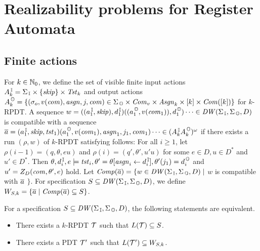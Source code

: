 \section{Realizability problems for Register Automata}
\subsection{Finite actions}
For $k\in\mathbb{N}_0$,
we define the set of visible finite input actions $A_k^{\, \mathbb{I}} = \Sigma_{\, \mathbb{I}}\times\{\mathit{skip}\}\times \mathit{Tst}_k$
and output actions $A_k^{\, \mathbb{O}} = \{(\sigma_o, v(\mathit{com}), \mathit{asgn}, j, \mathit{com})\in \Sigma_{\, \mathbb{O}}\times\mathit{Com}_v\times \mathit{Asgn}_k\times [k]\times \mathit{Com}([k])\}$ for $k$-RPDT.
A sequence $w = ((a^{\, \mathbb{I}}_1, \mathit{skip}),d^{\, \mathbb{I}}_1) ((a^{\, \mathbb{O}}_1,v(\mathit{com}_1)),d^{\, \mathbb{O}}_1)\cdots \in \mathit{DW}(\Sigma_{\, \mathbb{I}},\Sigma_{\, \mathbb{O}},D)$ is compatible with a sequence
$\overline{a} = (a^{\, \mathbb{I}}_1, \mathit{skip},\mathit{tst}_1)(a^{\, \mathbb{O}}_1,v(\mathit{com}_1),\mathit{asgn}_1,j_1, \mathit{com}_1)\cdots \in (A_k^{\, \mathbb{I}} A_k^{\, \mathbb{O}})^\omega$
if there exists a run $(\rho, w)$ of $k$-RPDT satisfying follows:
For all $i\geq 1$, let $\rho(i-1)=(q,\theta,eu)$ and $\rho(i)=(q',\theta',u'u)$
for some $e\in D, u\in D^*$ and $u'\in D^*$.
Then $\theta, d^{\, \mathbb{I}}_i, e\models \mathit{tst}_i, \theta'=\theta[\mathit{asgn}_i\leftarrow d^{\, \mathbb{I}}_i], \theta'(j_1) = d^{\, \mathbb{O}}_i$ and $u'=Z_D(\mathit{com},\theta',e)$ hold.
Let ${\mathit{Comp}}(\overline{a}) = \{w\in \mathit{DW}(\Sigma_{\, \mathbb{I}},\Sigma_{\, \mathbb{O}},D)\mid$ $w$ is compatible with $\overline{a}$ $\}$.
For specification $S \subseteq \mathit{DW}(\Sigma_{\, \mathbb{I}},\Sigma_{\, \mathbb{O}},D)$, we define $W_{S,k}=\{\overline{a}\mid {\mathit{Comp}}(\overline{a})\subseteq S\}$.

\begin{theorem}\label{the: finite_actions}
For a specification $S\subseteq \mathit{DW}(\Sigma_{\, \mathbb{I}},\Sigma_{\, \mathbb{O}},D)$, the following statements are equivalent.
\begin{itemize}
\item There exists a $k$-RPDT ${\cal T}$ such that $L({\cal T})\subseteq S$.
\item There exists a PDT ${\cal T}'$ such that $L({\cal T}')\subseteq W_{S,k}$.
\end{itemize}
\end{theorem}


